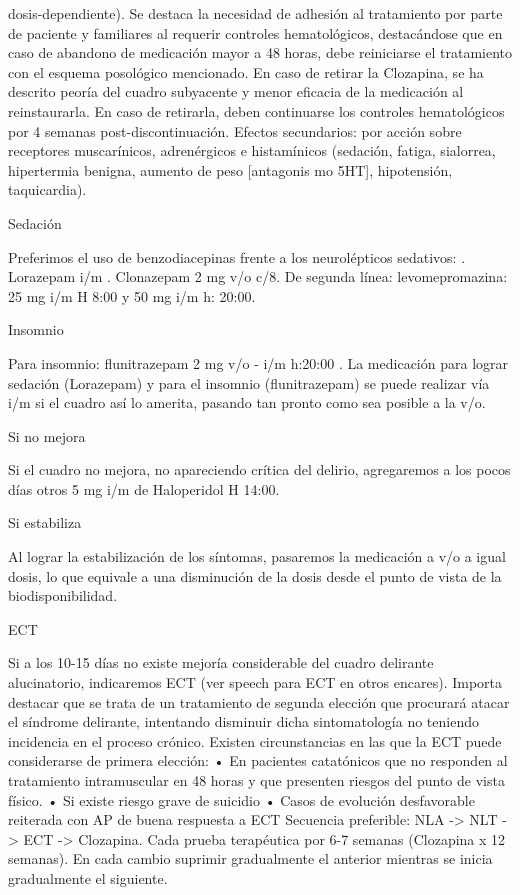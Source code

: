 \documentclass{scrbook}
\begin{document}
dosis-dependiente). Se destaca la necesidad de adhesión al tratamiento por parte de paciente y familiares al requerir controles hematológicos, destacándose que en caso de abandono de medicación mayor a 48 horas, debe reiniciarse el tratamiento con el esquema posológico mencionado. En caso de retirar la Clozapina, se ha descrito peoría del cuadro subyacente y menor eficacia de la medicación al reinstaurarla. En caso de retirarla, deben continuarse los controles hematológicos por 4 semanas post-discontinuación. Efectos secundarios: por acción sobre receptores muscarínicos, adrenérgicos e histamínicos (sedación, fatiga, sialorrea, hipertermia benigna, aumento de peso [antagonis mo 5HT], hipotensión, taquicardia).

Sedación

Preferimos el uso de benzodiacepinas frente a los neurolépticos sedativos: . Lorazepam i/m . Clonazepam 2 mg v/o c/8. De segunda línea: levomepromazina: 25 mg i/m H 8:00 y 50 mg i/m h: 20:00.

Insomnio

Para insomnio: flunitrazepam 2 mg v/o - i/m h:20:00 . La medicación para lograr sedación (Lorazepam) y para el insomnio (flunitrazepam) se puede realizar vía i/m si el cuadro así lo amerita, pasando tan pronto como sea posible a la v/o.

Si no mejora

Si el cuadro no mejora, no apareciendo crítica del delirio, agregaremos a los pocos días otros 5 mg i/m de Haloperidol H 14:00.

Si estabiliza

Al lograr la estabilización de los síntomas, pasaremos la medicación a v/o a igual dosis, lo que equivale a una disminución de la dosis desde el punto de vista de la biodisponibilidad.

ECT

Si a los 10-15 días no existe mejoría considerable del cuadro delirante alucinatorio, indicaremos ECT (ver speech para ECT en otros encares). Importa destacar que se trata de un tratamiento de segunda elección que procurará atacar el síndrome delirante, intentando disminuir dicha sintomatología no teniendo incidencia en el proceso crónico. Existen circunstancias en las que la ECT puede considerarse de primera elección: • En pacientes catatónicos que no responden al tratamiento intramuscular en 48 horas y que presenten riesgos del punto de vista físico. • Si existe riesgo grave de suicidio • Casos de evolución desfavorable reiterada con AP de buena respuesta a ECT Secuencia preferible: NLA -> NLT -> ECT -> Clozapina. Cada prueba terapéutica por 6-7 semanas (Clozapina x 12 semanas). En cada cambio suprimir gradualmente el anterior mientras se inicia gradualmente el siguiente.
\end{document}

